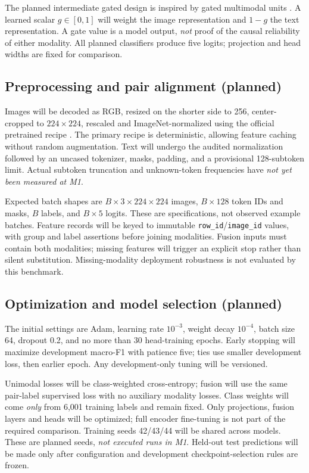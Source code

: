 \documentclass[11pt,a4paper]{article}
\begin{document}
The planned intermediate gated design is inspired by gated multimodal units \cite{arevalo2017}. A learned scalar $g\in[0,1]$ will weight the image representation and $1-g$ the text representation. A gate value is a model output, \emph{not} proof of the causal reliability of either modality. All planned classifiers produce five logits; projection and head widths are fixed for comparison.

\subsection{Preprocessing and pair alignment (planned)}
Images will be decoded as RGB, resized on the shorter side to 256, center-cropped to $224\times224$, rescaled and ImageNet-normalized using the official pretrained recipe \cite{torchvision}. The primary recipe is deterministic, allowing feature caching without random augmentation. Text will undergo the audited normalization followed by an uncased tokenizer, masks, padding, and a provisional 128-subtoken limit. Actual subtoken truncation and unknown-token frequencies have \emph{not yet been measured at M1}.

Expected batch shapes are $B\times3\times224\times224$ images, $B\times128$ token IDs and masks, $B$ labels, and $B\times5$ logits. These are specifications, not observed example batches. Feature records will be keyed to immutable \texttt{row\_id}/\texttt{image\_id} values, with group and label assertions before joining modalities. Fusion inputs must contain both modalities; missing features will trigger an explicit stop rather than silent substitution. Missing-modality deployment robustness is not evaluated by this benchmark.

\subsection{Optimization and model selection (planned)}
The initial settings are Adam, learning rate $10^{-3}$, weight decay $10^{-4}$, batch size 64, dropout 0.2, and no more than 30 head-training epochs. Early stopping will maximize development macro-F1 with patience five; ties use smaller development loss, then earlier epoch. Any development-only tuning will be versioned.

Unimodal losses will be class-weighted cross-entropy; fusion will use the same pair-label supervised loss with no auxiliary modality losses. Class weights will come \emph{only} from 6,001 training labels and remain fixed. Only projections, fusion layers and heads will be optimized; full encoder fine-tuning is not part of the required comparison. Training seeds 42/43/44 will be shared across models. These are planned seeds, \emph{not executed runs in M1}. Held-out test predictions will be made only after configuration and development checkpoint-selection rules are frozen.
\end{document}
